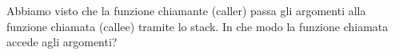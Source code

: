 \myindex{\Stack}

Abbiamo visto che la funzione chiamante (\gls{caller}) passa gli argomenti alla funzione chiamata (\gls{callee}) tramite lo stack.
In che modo la funzione chiamata accede agli argomenti?







